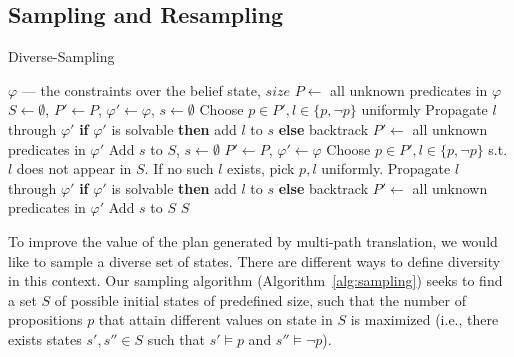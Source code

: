 \documentclass[letterpaper]{article}
\numberwithin{equation}{section}	%
\begin{document}
\subsection{Sampling and Resampling}
\label{scn:Sampling}

\begin{algorithm}[ht]
    \caption{Diverse-Sampling}
    \label{alg:sampling}
\scriptsize
  \begin{algorithmic}
      \REQUIRE $\varphi$ --- the constraints over the belief state, $size$
      \STATE $P \leftarrow$ all unknown predicates in $\varphi$
      \STATE $S \leftarrow \emptyset$, $P' \leftarrow P$, $\varphi' \leftarrow \varphi$, $s \leftarrow \emptyset$
      \STATE Choose $p \in P', l \in \{p, \neg p\}$ uniformly
    \STATE Propagate $l$ through $\varphi'$
     \STATE \textbf{if} $\varphi'$ is solvable \textbf{then} add $l$ to $s$ \textbf{else} backtrack
        \STATE $P' \leftarrow$ all unknown predicates in $\varphi'$
      \ENDWHILE
      \STATE Add $s$ to $S$, $s \leftarrow \emptyset$
       \STATE $P' \leftarrow P$, $\varphi' \leftarrow \varphi$
      \STATE Choose $p \in P', l \in \{p, \neg p\}$ s.t. $l$ does not appear in $S$. If no such $l$ exists, pick $p,l$ uniformly.
    \STATE Propagate $l$ through $\varphi'$
     \STATE \textbf{if} $\varphi'$ is solvable \textbf{then} add $l$ to $s$ \textbf{else} backtrack
      \STATE $P' \leftarrow$ all unknown predicates in $\varphi'$
      \ENDWHILE
      \STATE Add $s$ to $S$
      \ENDWHILE
      \RETURN $S$
    \end{algorithmic}
   \end{algorithm}

To improve the value of the plan generated by multi-path translation, we would like to sample a diverse set of states.
There are different ways to define diversity in this context. Our sampling algorithm (Algorithm~\ref{alg:sampling})
seeks to find a set $S$ of possible initial states of predefined size, such that the number of propositions $p$
that attain different values on state in $S$ is maximized (i.e., there exists states $s',s''\in S$ such that $s'\models p$ and $s''\models\neg p$).
\end{document}
